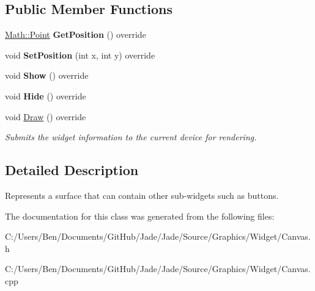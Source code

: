 \subsection*{Public Member Functions}
\begin{DoxyCompactItemize}
\item 
\hypertarget{class_jade_1_1_graphics_1_1_canvas_a01d393cf06c44abfa47a90fd821dc8e6}{}\hyperlink{class_jade_1_1_math_1_1_point}{Math\+::\+Point} {\bfseries Get\+Position} () override\label{class_jade_1_1_graphics_1_1_canvas_a01d393cf06c44abfa47a90fd821dc8e6}

\item 
\hypertarget{class_jade_1_1_graphics_1_1_canvas_a49bd7c325e32d4b33186dd37c99eeaa0}{}void {\bfseries Set\+Position} (int x, int y) override\label{class_jade_1_1_graphics_1_1_canvas_a49bd7c325e32d4b33186dd37c99eeaa0}

\item 
\hypertarget{class_jade_1_1_graphics_1_1_canvas_a751e96de017443e39996dd0b7422b301}{}void {\bfseries Show} () override\label{class_jade_1_1_graphics_1_1_canvas_a751e96de017443e39996dd0b7422b301}

\item 
\hypertarget{class_jade_1_1_graphics_1_1_canvas_a64eb9015cdd78f996fcaa91bd55b37af}{}void {\bfseries Hide} () override\label{class_jade_1_1_graphics_1_1_canvas_a64eb9015cdd78f996fcaa91bd55b37af}

\item 
\hypertarget{class_jade_1_1_graphics_1_1_canvas_a56595e81b3df271caab041a7774d8645}{}void \hyperlink{class_jade_1_1_graphics_1_1_canvas_a56595e81b3df271caab041a7774d8645}{Draw} () override\label{class_jade_1_1_graphics_1_1_canvas_a56595e81b3df271caab041a7774d8645}

\begin{DoxyCompactList}\small\item\em Submits the widget information to the current device for rendering. \end{DoxyCompactList}\end{DoxyCompactItemize}


\subsection{Detailed Description}
Represents a surface that can contain other sub-\/widgets such as buttons. 

The documentation for this class was generated from the following files\+:\begin{DoxyCompactItemize}
\item 
C\+:/\+Users/\+Ben/\+Documents/\+Git\+Hub/\+Jade/\+Jade/\+Source/\+Graphics/\+Widget/Canvas.\+h\item 
C\+:/\+Users/\+Ben/\+Documents/\+Git\+Hub/\+Jade/\+Jade/\+Source/\+Graphics/\+Widget/Canvas.\+cpp\end{DoxyCompactItemize}
